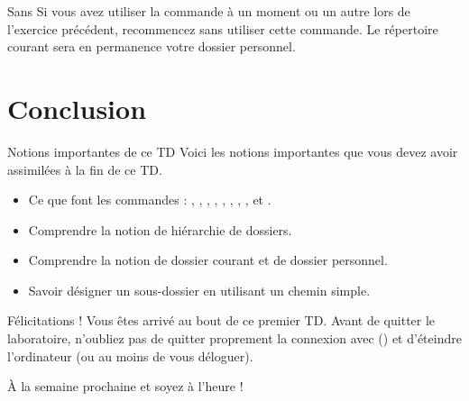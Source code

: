 \documentclass[a4paper,11pt]{style-esi/td}
\begin{document}
		\begin{Exercice}{Sans }
			Si vous avez utiliser la commande 
			à un moment ou un autre lors de l'exercice précédent,
			recommencez sans utiliser cette commande.
			Le répertoire courant sera en permanence votre dossier personnel.
		\end{Exercice}

\section{Conclusion}

	\begin{theorie}{Notions importantes de ce TD}
		Voici les notions importantes que vous devez avoir assimilées à la fin de ce TD.
		\begin{itemize}
		\item 
			Ce que font les commandes : 
			, , , ,
			, , , 
			,  et .
		\item 
			Comprendre la notion de hiérarchie de dossiers.
		\item 
			Comprendre la notion de dossier courant
			et de dossier personnel.
		\item 
			Savoir désigner un sous-dossier en utilisant un chemin simple.
		\end{itemize}
	\end{theorie}

	\bigskip
	\begin{infotbox}{Félicitations !} 
		Vous êtes arrivé au bout de ce premier TD.
		Avant de quitter le laboratoire, n'oubliez pas de quitter proprement 
		la connexion avec  () 
		et d'éteindre l'ordinateur (ou au moins de vous déloguer).

		À la semaine prochaine et soyez à l'heure !
	\end{infotbox}
\end{document}
